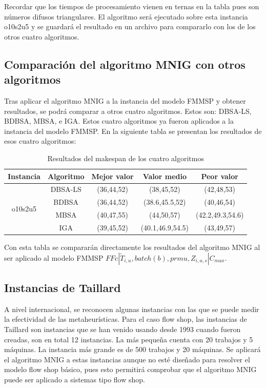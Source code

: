 \documentclass{article}
\def\notac_modelo{$FFc | \tilde{T}_{i, u}, batch(b), prmu, Z_{i, u, s} | C_{max}$}
\begin{document}
Recordar que los tiempos de procesamiento vienen en ternas en la tabla pues son números difusos triangulares. El algoritmo será ejecutado sobre esta instancia o10s2u5 y se guardará el resultado en un archivo para compararlo con los de los otros cuatro algoritmos.

\subsection{Comparación del algoritmo MNIG con otros algoritmos}

Tras aplicar el algoritmo MNIG a la instancia del modelo FMMSP y obtener resultados, se podrá comparar a otros cuatro algoritmos. Estos son: DBSA-LS, BDBSA, MBSA, e IGA. Estos cuatro algoritmos ya fueron aplicados a la instancia del modelo FMMSP. En la siguiente tabla se presentan los resultados de esos cuatro algoritmos: \autocite{modFMMSP}

\begin{table}[h]
    \caption{Resultados del makespan de los cuatro algoritmos}
    \label{tab:algs}
    \begin{center}
    \begin{tabular}{ccccc}
        \hline
        Instancia & Algoritmo & Mejor valor & Valor medio & Peor valor\\
        \hline
        \multirow{4}{*}{o10s2u5} & DBSA-LS & (36,44,52) & (38,45,52) & (42,48,53)\\
         & BDBSA & (36,44,52) & (38.6,45.5,52) & (40,46,54)\\
         & MBSA & (40,47,55) & (44,50,57) & (42.2,49.3,54.6)\\
         & IGA & (39,45,52) & (40.1,46.9,54.5) & (43,49,57)\\
        \hline
    \end{tabular}
    \end{center}
\end{table}

Con esta tabla se compararán directamente los resultados del algoritmo MNIG al ser aplicado al modelo FMMSP \notac_modelo.

\subsection{Instancias de Taillard}

A nivel internacional, se reconocen algunas instancias con las que se puede medir la efectividad de las metaheurísticas. Para el caso flow shop, las instancias de Taillard son instancias que se han venido usando desde 1993 cuando fueron creadas, son en total 12 instancias. La más pequeña cuenta con 20 trabajos y 5 máquinas. La instancia más grande es de 500 trabajos y 20 máquinas. Se aplicará el algoritmo MNIG a estas instancias aunque no esté diseñado para resolver el modelo flow shop básico, pues esto permitirá comprobar que el algoritmo MNIG puede ser aplicado a sistemas tipo flow shop.
\end{document}
